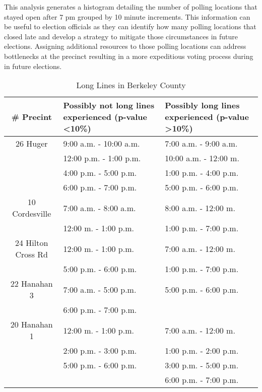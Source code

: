 This analysis generates a histogram detailing the number of polling locations that stayed open after 7 pm grouped by 10 minute increments. This information can be useful to election officials as they can identify how many polling locations that closed late and develop a strategy to mitigate those circumstances in future elections. Assigning additional resources to those polling locations can address bottlenecks at the precinct resulting in a more expeditious voting process during in future elections.
\begin{table*}
    \begin{center}
    \begin{tabular}{| c | p{5cm} | p{4.5cm} |}
    \hline                   
    \# Precint & Possibly not long lines experienced (p-value \textless 10\%)&Possibly long lines experienced (p-value \textgreater 10\%)\\
    \hline
    26 Huger&9:00 a.m. - 10:00 a.m. &7:00 a.m. - 9:00 a.m.\\
            &12:00 p.m. - 1:00 p.m. &10:00 a.m. - 12:00 m.\\
            &4:00 p.m. - 5:00 p.m. &1:00 p.m. - 4:00 p.m.\\
            &6:00 p.m. - 7:00 p.m. &5:00 p.m. - 6:00 p.m.\\
    \hline
    10 Cordesville &7:00 a.m. - 8:00 a.m.&8:00 a.m. - 12:00 m.\\
                   &12:00 m. - 1:00 p.m.&1:00 p.m. - 7:00 p.m.\\
    \hline  
    24 Hilton Cross Rd &12:00 m. - 1:00 p.m. &7:00 a.m. - 12:00 m.\\
                       &5:00 p.m. - 6:00 p.m. &1:00 p.m. - 7:00 p.m.\\
    \hline
    22 Hanahan 3 &7:00 a.m. - 5:00 p.m. &5:00 p.m. - 6:00 p.m.\\
                 &6:00 p.m. - 7:00 p.m.&\\
    \hline
    20 Hanahan 1 &12:00 m. - 1:00 p.m. &7:00 a.m. - 12:00 m.\\
                 &2:00 p.m. - 3:00 p.m. &1:00 p.m. - 2:00 p.m.\\
                 &5:00 p.m. - 6:00 p.m. &3:00 p.m. - 5:00 p.m.\\
                 &                      &6:00 p.m. - 7:00 p.m.\\
    \hline
    \end{tabular}
    \end{center}
    \caption{Long Lines in Berkeley County}
    \label{tab:line}
\end{table*}
